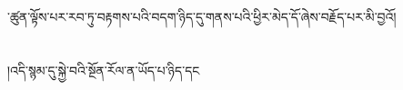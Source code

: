 ་ཚུན་ལྟོས་པར་རབ་ཏུ་བརྟགས་པའི་བདག་ཉིད་དུ་གནས་པའི་ཕྱིར་མེད་དོ་ཞེས་བརྗོད་པར་མི་བྱའོ།\chapter{ }།འདི་སྙམ་དུ་སྐྱེ་བའི་སྔོན་རོལ་ན་ཡོད་པ་ཉིད་དང
